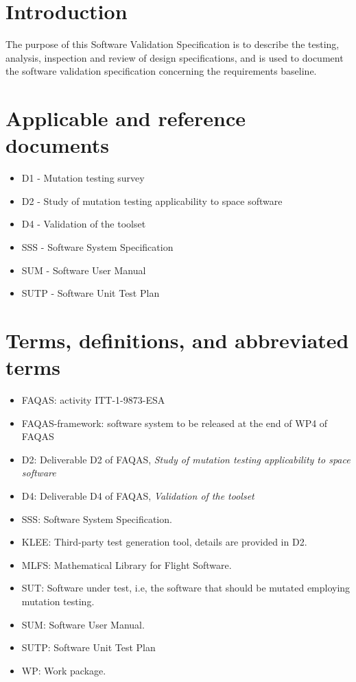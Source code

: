 
\chapter{Introduction}

The purpose of this  Software Validation Specification is to describe the testing, analysis, inspection and
review of design specifications, and is used to document the software validation specification concerning the requirements baseline.

\chapter{Applicable and reference documents}

\begin{itemize}
\item{D1 - Mutation testing survey}
\item{D2 - Study of mutation testing applicability to space software}
\item{D4 - Validation of the toolset}
\item{SSS - Software System Specification}
\item{SUM - Software User Manual}
\item{SUTP - Software Unit Test Plan}

\end{itemize}

\chapter{Terms, definitions, and abbreviated terms}

\begin{itemize}
\item{FAQAS}: activity ITT-1-9873-ESA
\item{FAQAS-framework}: software system to be released at the end of WP4 of FAQAS
\item{D2}: Deliverable D2 of FAQAS, \emph{Study of mutation testing applicability to space software}
\item{D4}: Deliverable D4 of FAQAS, \emph{Validation of the toolset}
\item{SSS}: Software System Specification.
\item{KLEE}: Third-party test generation tool, details are provided in D2.
\item{MLFS}: Mathematical Library for Flight Software.
\item{SUT}: Software under test, i.e, the software that should be mutated employing mutation testing.
\item{SUM}: Software User Manual.
\item{SUTP}: Software Unit Test Plan
\item{WP}: Work package.

\end{itemize}

